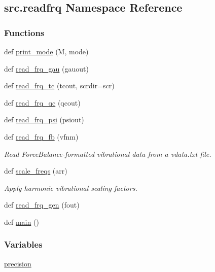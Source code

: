 \hypertarget{namespacesrc_1_1readfrq}{}\subsection{src.\+readfrq Namespace Reference}
\label{namespacesrc_1_1readfrq}
\subsubsection*{Functions}
\begin{DoxyCompactItemize}
\item 
def \hyperlink{namespacesrc_1_1readfrq_aa63f27ca510452256ef35b8d7052966c}{print\+\_\+mode} (M, mode)
\item 
def \hyperlink{namespacesrc_1_1readfrq_acea99aa6d0048a5ef5afedb360fb27e3}{read\+\_\+frq\+\_\+gau} (gauout)
\item 
def \hyperlink{namespacesrc_1_1readfrq_af9e59f81d04fd3dfbb651e36175fa1b1}{read\+\_\+frq\+\_\+tc} (tcout, scrdir=\textquotesingle{}scr\textquotesingle{})
\item 
def \hyperlink{namespacesrc_1_1readfrq_a3658ba083ec7f18a0bfbada9e6272301}{read\+\_\+frq\+\_\+qc} (qcout)
\item 
def \hyperlink{namespacesrc_1_1readfrq_ab76215acf9b8b25d9fcdfa39e6af2633}{read\+\_\+frq\+\_\+psi} (psiout)
\item 
def \hyperlink{namespacesrc_1_1readfrq_a48a1a99942b010b7408fd2de6561701f}{read\+\_\+frq\+\_\+fb} (vfnm)
\begin{DoxyCompactList}\small\item\em Read Force\+Balance-\/formatted vibrational data from a vdata.\+txt file. \end{DoxyCompactList}\item 
def \hyperlink{namespacesrc_1_1readfrq_a9e21ebdbb91f1755474babee99d79563}{scale\+\_\+freqs} (arr)
\begin{DoxyCompactList}\small\item\em Apply harmonic vibrational scaling factors. \end{DoxyCompactList}\item 
def \hyperlink{namespacesrc_1_1readfrq_aa60d506cc40377d6ca6736729b25a8bd}{read\+\_\+frq\+\_\+gen} (fout)
\item 
def \hyperlink{namespacesrc_1_1readfrq_acab07dc315e92f5dd2ee338248f72a49}{main} ()
\end{DoxyCompactItemize}
\subsubsection*{Variables}
\begin{DoxyCompactItemize}
\item 
\hyperlink{namespacesrc_1_1readfrq_a7bb7119f24be0beb36af3c38a07aea38}{precision}
\end{DoxyCompactItemize}


